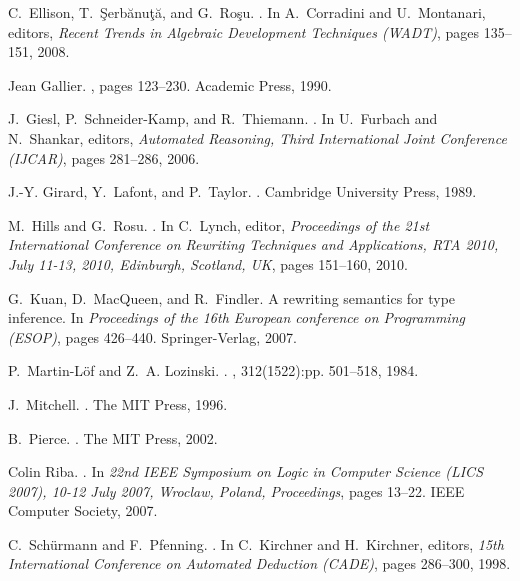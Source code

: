 \documentclass{LMCS}
\begin{document}
\begin{thebibliography}{10}
C.~Ellison, T.~\c{S}erb\u{a}nu\c{t}\u{a}, and G.~Ro\c{s}u.
.
\newblock In A.~Corradini and U.~Montanari, editors, {\em Recent Trends in
  Algebraic Development Techniques (WADT)}, pages 135--151, 2008.

Jean Gallier.
, pages 123--230.
\newblock Academic Press, 1990.

J.~Giesl, P.~Schneider-Kamp, and R.~Thiemann.
.
\newblock In U.~Furbach and N.~Shankar, editors, {\em Automated Reasoning,
  Third International Joint Conference (IJCAR)}, pages 281--286, 2006.

J.-Y. Girard, Y.~Lafont, and P.~Taylor.
.
\newblock Cambridge University Press, 1989.

M.~Hills and G.~Rosu.
.
\newblock In C.~Lynch, editor, {\em Proceedings of the 21st International
  Conference on Rewriting Techniques and Applications, RTA 2010, July 11-13,
  2010, Edinburgh, Scotland, UK}, pages 151--160, 2010.

G.~Kuan, D.~MacQueen, and R.~Findler.
\newblock A rewriting semantics for type inference.
\newblock In {\em Proceedings of the 16th European conference on Programming
  (ESOP)}, pages 426--440. Springer-Verlag, 2007.

P.~Martin-L{\"o}f and Z.~A. Lozinski.
.
, 312(1522):pp. 501--518, 1984.

J.~Mitchell.
.
\newblock The MIT Press, 1996.

B.~Pierce.
.
\newblock The MIT Press, 2002.

Colin Riba.
.
\newblock In {\em 22nd IEEE Symposium on Logic in Computer Science (LICS 2007),
  10-12 July 2007, Wroclaw, Poland, Proceedings}, pages 13--22. IEEE Computer
  Society, 2007.

C.~Sch{\"u}rmann and F.~Pfenning.
.
\newblock In C.~Kirchner and H.~Kirchner, editors, {\em 15th International
  Conference on Automated Deduction (CADE)}, pages 286--300, 1998.


\end{thebibliography}
\end{document}
